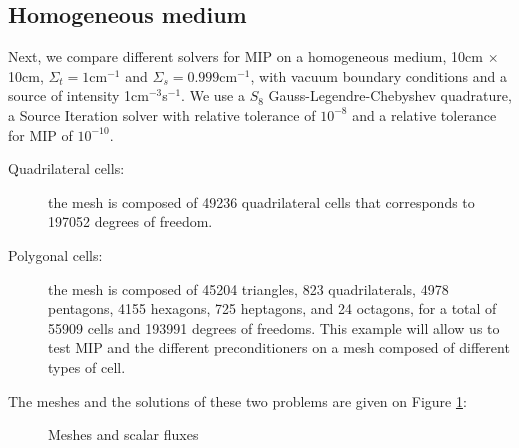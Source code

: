 \subsection{Homogeneous medium}
Next, we compare different solvers for MIP on a homogeneous medium, 10cm $\times$
10cm, $\Sigma_t=1$cm$^{-1}$ and $\Sigma_s=0.999$cm$^{-1}$, with vacuum boundary 
conditions and a source of intensity 1cm$^{-3}$s$^{-1}$. We use a $S_8$
Gauss-Legendre-Chebyshev quadrature, a Source Iteration solver with relative
tolerance of $10^{-8}$ and a relative tolerance for MIP of $10^{-10}$.
\begin{description}
  \item[Quadrilateral cells:] the mesh is composed of 49236 quadrilateral cells
    that corresponds to 197052 degrees of freedom.
  \item[Polygonal cells:] the mesh is composed of 45204 triangles, 823 
    quadrilaterals, 4978 pentagons, 4155 hexagons, 725 heptagons, and 24 
    octagons, for a total of 55909 cells and 193991 degrees of freedoms. This 
    example will allow us to test MIP and the different preconditioners on a 
    mesh composed of different types of cell.
\end{description}
The meshes and the solutions of these two problems are given on Figure
\ref{fig_meshes_phi}:
\begin{figure}[H]
\centering    
{}
\caption{Meshes and scalar fluxes}
\label{fig_meshes_phi}
\end{figure}

